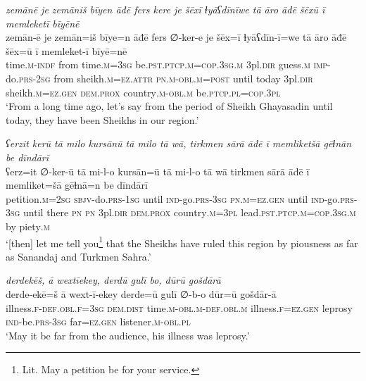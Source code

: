 \ea \label{DG.8}
\textit{zemānē je zemāniš bīyen āđē fers kere je šēxī ɫyāʕdīnīwe tā āro āđē šēxū ī memleketī bīyēnē} \\ 
\gll zemān-ē je zemān=iš bīye=n āđē fers ∅-ker-e je šēx=ī ɫyāʕdīn-ī=we tā āro āđē šēx=ū ī memleket-ī bīyē=nē \\ 
 time\textsc{.m}\textsc{-indf} from time\textsc{.m}\textsc{=3sg} be\textsc{.pst}\textsc{.ptcp}\textsc{.m}\textsc{=cop}\textsc{.3sg}\textsc{.m} 3pl\textsc{.dir} guess\textsc{.m} \textsc{imp-}do\textsc{.prs}-\textsc{2sg} from sheikh\textsc{.m}\textsc{=ez}.\textsc{attr} \textsc{pn}\textsc{.m}\textsc{-obl}\textsc{.m}\textsc{=\textsc{post}} until today 3pl\textsc{.dir} sheikh\textsc{.m}\textsc{=ez}\textsc{.gen} \textsc{dem.prox} country\textsc{.m}\textsc{-obl}\textsc{.m} be\textsc{.ptcp}\textsc{.pl}\textsc{=cop}\textsc{.3pl} \\ 
\glt `From a long time ago, let’s say from the period of Sheikh Ghayasadin until today, they have been Sheikhs in our region.'
\z 
 
\ea \label{DG.10}
\textit{ʕerzit kerū tā milo kursānū tā milo tā wā, tirkmen sārā āđē ī memliketšā gēɫnān be dīndārī} \\ 
\gll ʕerz=it ∅-ker-ū tā mi-l-o kursān=ū tā mi-l-o tā wā tirkmen sārā āđē ī memliket=šā gēɫnā=n be dīndārī \\ 
 petition\textsc{.m}\textsc{=\textsc{2sg}} \textsc{sbjv-}do\textsc{.prs}\textsc{-1sg} until \textsc{ind-}go\textsc{.prs}\textsc{-3sg} \textsc{pn}\textsc{.m}\textsc{=ez}\textsc{.gen} until \textsc{ind-}go\textsc{.prs}\textsc{-3sg} until there \textsc{pn} \textsc{pn} 3pl\textsc{.dir} \textsc{dem.prox} country\textsc{.m}\textsc{=3pl} lead\textsc{.pst}\textsc{.ptcp}\textsc{.m}\textsc{=cop}\textsc{.3sg}\textsc{.m} by piety\textsc{.m} \\ 
\glt `[then] let me tell you\footnote{Lit. May a petition be for your service.} that the Sheikhs have ruled this region by piousness as far as Sanandaj and Turkmen Sahra.'
\z 
 
\ea \label{DG.13}
\textit{derdekēš, ā wextīekey, derdū gulī bo, dūrū gošdārā} \\ 
\gll derde-ekē=š ā wext-ī-ekey derde=ū gulī ∅-b-o dūr=ū gošdār-ā \\ 
 illness\textsc{\textsc{.f}}\textsc{-def}\textsc{.obl}\textsc{\textsc{.f}}\textsc{=3sg} \textsc{dem.dist} time\textsc{.m}\textsc{-obl}\textsc{.m}\textsc{-def}\textsc{.obl}\textsc{.m} illness\textsc{\textsc{.f}}\textsc{=ez}\textsc{.gen} leprosy \textsc{ind-}be\textsc{.prs}\textsc{-3sg} far\textsc{=ez}\textsc{.gen} listener\textsc{.m}\textsc{-obl}\textsc{.pl} \\ 
\glt `May it be far from the audience, his illness was leprosy.'
\z 
 
